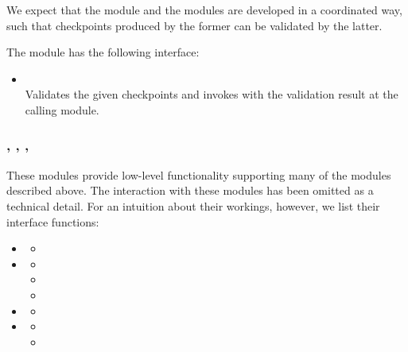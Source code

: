 \documentclass{article}
\begin{document}
We expect that the  module and the  modules are developed in a coordinated way,
such that checkpoints produced by the former can be validated by the latter.

The  module has the following interface:

\begin{itemize}

    \item {}\\
    Validates the given checkpoints and invokes  with the validation result at the calling module.
    
\end{itemize}

\subsubsection{, , , }

These modules provide low-level functionality supporting many of the modules described above.
The interaction with these modules has been omitted as a technical detail.
For an intuition about their workings, however, we list their interface functions:
\begin{itemize}
    
    \item {}
    \begin{itemize}
        \item {}
    \end{itemize}
    
    \item {}
    \begin{itemize}
        \item {}
        \item {}
        \item {}
    \end{itemize}

    \item {}
    \begin{itemize}
        \item {}
    \end{itemize}

    \item {}
    \begin{itemize}
        \item {}
        \item {}
    \end{itemize}
    
\end{itemize}
\end{document}
